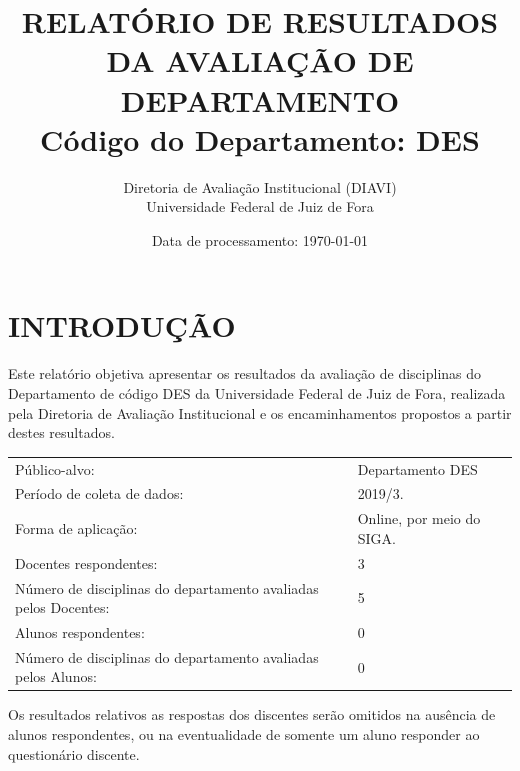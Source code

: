 \documentclass[a4paper,10pt]{article}
\date{Data de processamento: \today}
\begin{document}
\author{Diretoria de Avaliação Institucional (DIAVI) \\ Universidade Federal de Juiz de Fora}

\title{RELATÓRIO DE RESULTADOS DA AVALIAÇÃO DE DEPARTAMENTO\\ Código do Departamento: DES}
\maketitle
\section{INTRODUÇÃO}
Este relatório objetiva apresentar os resultados da avaliação de disciplinas do Departamento     de código DES da Universidade Federal de Juiz de Fora, realizada pela     Diretoria de Avaliação Institucional e os encaminhamentos propostos a     partir destes resultados.

\begin{center}
\begin{tabularx}{\linewidth}{X|l}

Público-alvo:& Departamento  DES\\

Período de coleta de dados:& 2019/3.\\

Forma de aplicação:& Online, por meio do SIGA.\\

Docentes respondentes:& 3\\

Número de disciplinas do departamento avaliadas pelos Docentes:& 5\\

Alunos   respondentes:& 0\\

Número de disciplinas do departamento  avaliadas pelos   Alunos:& 0\\
\end{tabularx}
\end{center}

Os resultados relativos as respostas dos discentes serão omitidos na ausência de alunos respondentes, ou na eventualidade de somente um aluno responder ao questionário discente.
\end{document}
